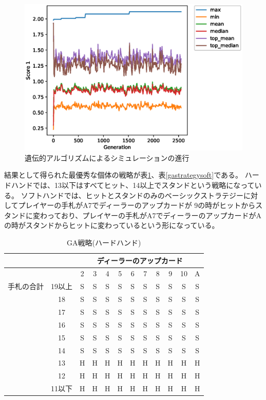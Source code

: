   \begin{figure}[htbp]
    \includegraphics[width=14.0cm]{figure/gaprocess.eps}
    \caption{遺伝的アルゴリズムによるシミュレーションの進行}
    \label{gaprocess}
  \end{figure}

結果として得られた最優秀な個体の戦略が表\ref{gastrategyhard}、表\ref{gastrategysoft}である。
ハードハンドでは、13以下はすべてヒット、14以上でスタンドという戦略になっている。
ソフトハンドでは、ヒットとスタンドのみのベーシックストラテジーに対してプレイヤーの手札がA7でディーラーのアップカードが
9の時がヒットからスタンドに変わっており、プレイヤーの手札がA7でディーラーのアップカードがAの時がスタンドからヒットに変わっているという形になっている。

  \begin{table}[htbp]
    \centering
    \caption{GA戦略(ハードハンド)\label{gastrategyhard}}
    \begin{tabular}{|c|c|c|c|c|c|c|c|c|c|c|c|}
      \hline
      \multicolumn{2}{|c|}{} & \multicolumn{10}{|c|}{ディーラーのアップカード} \\ \hline
      \multicolumn{2}{|c|}{} & 2 & 3 & 4 & 5 & 6 & 7 & 8 & 9 & 10 & A \\ \hline
      手札の合計 & 19以上 & S & S & S & S & S & S & S & S & S & S \\ \cline{3-12}
                & 18 & S & S & S & S & S & S & S & S & S & S \\ \cline{3-12}
                & 17 & S & S & S & S & S & S & S & S & S & S \\ \cline{3-12}
                & 16 & S & S & S & S & S & S & S & S & S & S \\ \cline{3-12}
                & 15 & S & S & S & S & S & S & S & S & S & S \\ \cline{3-12}
                & 14 & S & S & S & S & S & S & S & S & S & S \\ \cline{3-12}
                & 13 & H & H & H & H & H & H & H & H & H & H \\ \cline{3-12}
                & 12 & H & H & H & H & H & H & H & H & H & H \\ \cline{3-12}
                & 11以下 & H & H & H & H & H & H & H & H & H & H \\ \hline
    \end{tabular}
  \end{table}

